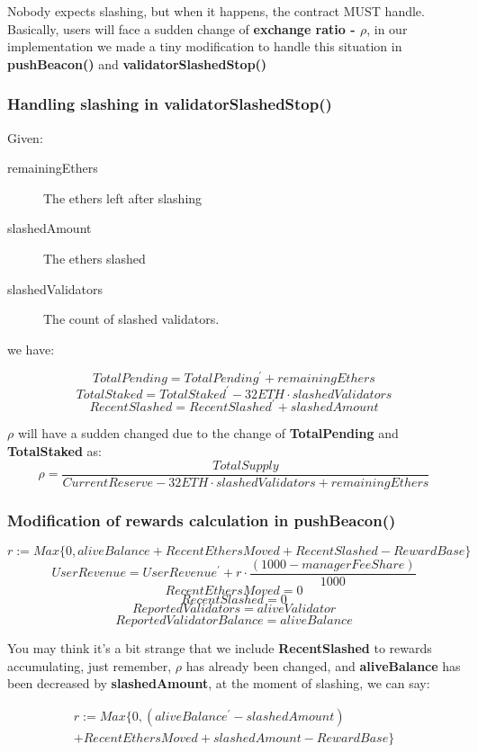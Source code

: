 \documentclass{article}
\begin{document}
Nobody expects slashing, but when it happens, the contract MUST handle. Basically, users will face a sudden change of \textbf{exchange ratio - $\rho$}, in our implementation we made a tiny modification to handle this situation in \textbf{pushBeacon()} and \textbf{validatorSlashedStop()}

\subsubsection{Handling slashing in validatorSlashedStop()}
Given:
\begin{description}
\item[remainingEthers] The ethers left after slashing
\item[slashedAmount] The ethers slashed
\item[slashedValidators] The count of slashed validators.
\end{description}
we have:
\begin{theorem}
\[TotalPending = TotalPending^{\prime} + remainingEthers \]
\[TotalStaked = TotalStaked^{\prime} - 32 ETH \cdot slashedValidators \]
\[RecentSlashed = RecentSlashed^{\prime} +  slashedAmount \]
\end{theorem}

$\rho$ will have a sudden changed due to the change of \textbf{TotalPending} and \textbf{TotalStaked} as:
\[\rho = \frac{TotalSupply}{CurrentReserve - 32 ETH \cdot slashedValidators + remainingEthers } \]

\subsubsection{Modification of rewards calculation in pushBeacon()}
\begin{theorem}
\[r := Max\{0, aliveBalance + RecentEthersMoved + RecentSlashed - RewardBase\}\]
\[UserRevenue = UserRevenue^{\prime} + r \cdot \frac{(1000 - managerFeeShare)}{1000}\]
\[RecentEthersMoved = 0\]
\[RecentSlashed = 0\]
\[ReportedValidators = aliveValidator\]
\[ReportedValidatorBalance = aliveBalance\]
\end{theorem}
You may think it's a bit strange that we include \textbf{RecentSlashed} to rewards accumulating, just remember, $\rho$ has already been changed, and 
\textbf{aliveBalance} has been decreased by \textbf{slashedAmount},  at the moment of slashing, we can say:

\begin{multline}
r := Max\{0, (aliveBalance^{\prime} - slashedAmount) \\
+ RecentEthersMoved + slashedAmount - RewardBase\}
\end{multline}
\end{document}

